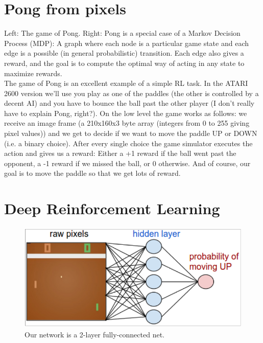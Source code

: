 \documentclass[12pt,a4paper]{article}
\begin{document}
\section{Pong from pixels}
Left: The game of Pong. Right: Pong is a special case of a Markov Decision Process (MDP): A graph where each node is a particular game state and each edge is a possible (in general probabilistic) transition. Each edge also gives a reward, and the goal is to compute the optimal way of acting in any state to maximize rewards.\\ 
The game of Pong is an excellent example of a simple RL task. In the ATARI 2600 version we’ll use you play as one of the paddles (the other is controlled by a decent AI) and you have to bounce the ball past the other player (I don’t really have to explain Pong, right?). On the low level the game works as follows: we receive an image frame (a 210x160x3 byte array (integers from 0 to 255 giving pixel values)) and we get to decide if we want to move the paddle UP or DOWN (i.e. a binary choice). After every single choice the game simulator executes the action and gives us a reward: Either a +1 reward if the ball went past the opponent, a -1 reward if we missed the ball, or 0 otherwise. And of course, our goal is to move the paddle so that we get lots of reward.\\


\section{Deep Reinforcement Learning}

\begin{figure}[hbt!]
\begin{center}
\includegraphics[scale=0.74]{ network}
\caption{Our network is a 2-layer fully-connected net. }%
\end{center}
\end{figure}\textbf{}
\end{document}
